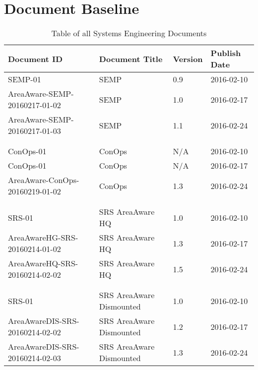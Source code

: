 %
\thispagestyle{fancy}
\chapter{Document Baseline}
\label{chp:baseline}


\begin{table}[h]
    \centering
    \label{tab:baseline}
    \begin{tabular}{llll}
    \textbf{Document ID} & \textbf{Document Title} & \textbf{Version} & \textbf{Publish Date} \\ \hline
    SEMP-01 & SEMP & 0.9 & 2016-02-10 \\ \hline
    AreaAware-SEMP-20160217-01-02 & SEMP & 1.0 & 2016-02-17 \\ \hline
    AreaAware-SEMP-20160217-01-03 & SEMP & 1.1 & 2016-02-24 \\ \hline
    &  &  &  \\
    &  &  &  \\
    ConOps-01 & ConOps & N/A & 2016-02-10 \\ \hline
    ConOps-01 & ConOps & N/A & 2016-02-17\\ \hline
    AreaAware-ConOps-20160219-01-02 & ConOps & 1.3 & 2016-02-24\\ \hline
    &  &  &  \\
    &  &  &  \\
    SRS-01 & SRS AreaAware HQ & 1.0 & 2016-02-10 \\ \hline
    AreaAwareHG-SRS-20160214-01-02 & SRS AreaAware HQ & 1.3 & 2016-02-17 \\ \hline
    AreaAwareHQ-SRS-20160214-02-02 & SRS AreaAware HQ & 1.5 & 2016-02-24 \\ \hline
    &  &  &  \\
    &  &  &  \\
    SRS-01 & SRS AreaAware Dismounted & 1.0 & 2016-02-10 \\ \hline
    AreaAwareDIS-SRS-20160214-02-02 & SRS AreaAware Dismounted & 1.2 & 2016-02-17 \\ \hline
    AreaAwareDIS-SRS-20160214-02-03 & SRS AreaAware Dismounted & 1.3 & 2016-02-24 \\ \hline
    \end{tabular}
    \caption{Table of all Systems Engineering Documents}
\end{table}



